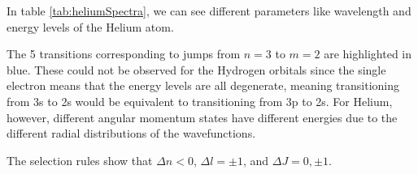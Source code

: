 In table \ref{tab:heliumSpectra}, we can see different parameters like wavelength and energy levels of the Helium atom.

The 5 transitions corresponding to jumps from $n = 3$ to $m = 2$ are highlighted in {\colorbox{blue!25} {blue}}. These could not be observed for the Hydrogen orbitals since the single electron means that the energy levels are all degenerate, meaning transitioning from 3s to 2s would be equivalent to transitioning from 3p to 2s. For Helium, however, different angular momentum states have different energies due to the different radial distributions of the wavefunctions.

The selection rules show that $\Delta n < 0$,  $\Delta l = \pm 1$, and $\Delta J = 0, \pm 1$.
